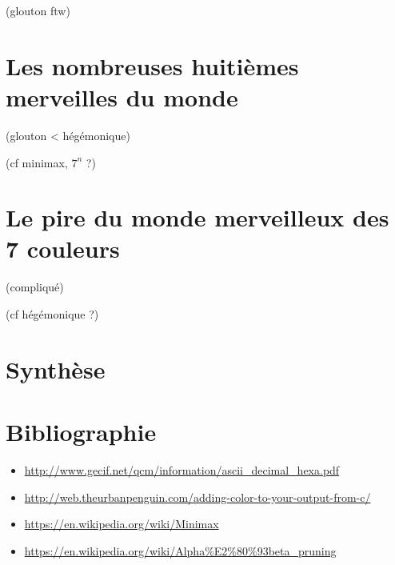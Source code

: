 \documentclass[12pt,L,fira-sans]{paper}
\begin{document}
\begin{qu}
	(glouton ftw)
\end{qu}

\section{Les nombreuses huitièmes merveilles du monde}

\begin{qu}
	(glouton < hégémonique)
\end{qu}

\begin{qu}
	(cf minimax, \(7^n\) ?)
\end{qu}

\section{Le pire du monde merveilleux des 7 couleurs}

\begin{qu}
	(compliqué)
\end{qu}

\begin{qu}
	(cf hégémonique ?)
\end{qu}

\section*{Synthèse}

\section*{Bibliographie}

\begin{itemize}
	\item \url{http://www.gecif.net/qcm/information/ascii_decimal_hexa.pdf}
	\item \url{http://web.theurbanpenguin.com/adding-color-to-your-output-from-c/}
	\item \url{https://en.wikipedia.org/wiki/Minimax}
	\item \url{https://en.wikipedia.org/wiki/Alpha%E2%80%93beta_pruning}
\end{itemize}
\end{document}
